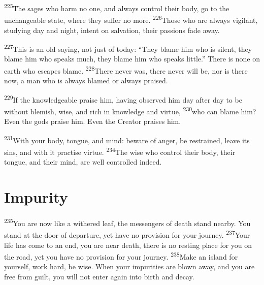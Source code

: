 \documentclass[openany,12pt,english]{book}
\newenvironment{para}{\par\pretolerance=100\tolerance=200\setlength{\emergencystretch}{0.6em}\relax}{\par}
\begin{document}
\begin{para}
    \textsuperscript{225}\thinspace{}The sages who harm no one, and al\-ways con\-trol their bod\-y, go to the un\-change\-a\-ble state, where they suf\-fer no more.
    \textsuperscript{226}\thinspace{}Those who are al\-ways vig\-i\-lant, stud\-y\-ing day and night, in\-tent on sal\-va\-tion, their passions fade a\-way.
\end{para}

\begin{para}
    \textsuperscript{227}\thinspace{}This is an old say\-ing, not just of to\-day: “They blame him who is si\-lent, they blame him who speaks much, they blame him who speaks lit\-tle.” There is none on earth who escapes blame.
    \textsuperscript{228}\thinspace{}There nev\-er was, there nev\-er will be, nor is there now, a man who is al\-ways blamed or al\-ways praised.
\end{para}

\begin{para}
    \textsuperscript{229}\thinspace{}If the knowl\-edge\-a\-ble praise him, hav\-ing ob\-served him day af\-ter day to be with\-out blem\-ish, wise, and rich in knowl\-edge and vir\-tue,
    \textsuperscript{230}\thinspace{}who can blame him? E\-ven the gods praise him. E\-ven the Cre\-a\-tor praises him.
\end{para}

\begin{para}
    \textsuperscript{231}\thinspace{}With your bod\-y, tongue, and mind: be\-ware of an\-ger, be restrained, leave its sins, and with it prac\-tise vir\-tue.
    \textsuperscript{234}\thinspace{}The wise who con\-trol their bod\-y, their tongue, and their mind, are well con\-trolled in\-deed.
\end{para}

\section*{Impurity}
\begin{para}
    \textsuperscript{235}\thinspace{}You are now like a withered leaf, the messengers of death stand near\-by. You stand at the door of de\-par\-ture, yet have no pro\-vi\-sion for your jour\-ney.
    \textsuperscript{237}\thinspace{}Your life has come to an end, you are near death, there is no rest\-ing place for you on the road, yet you have no pro\-vi\-sion for your jour\-ney.
    \textsuperscript{238}\thinspace{}Make an is\-land for your\-self, work hard, be wise. When your impurities are blown a\-way, and you are free from guilt, you will not en\-ter a\-gain in\-to birth and de\-cay.
\end{para}
\end{document}
